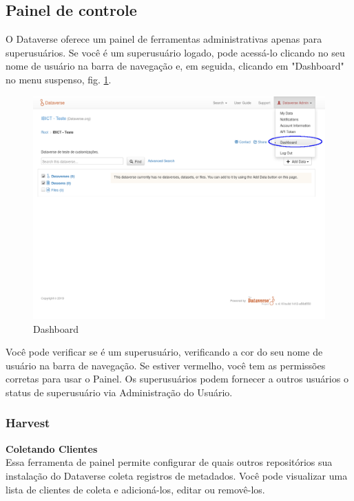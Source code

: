 \documentclass[12pt,hidelinks]{article}
\begin{document}
\newpage

    \subsection{Painel de controle}
    
\qquad O Dataverse oferece um painel de ferramentas administrativas apenas para  superusuários. Se você é um superusuário logado, pode acessá-lo clicando no seu nome de usuário na barra de navegação e, em seguida, clicando em "Dashboard" no menu suspenso, fig. \ref{img01.png}.


\begin{figure}[!htp]
    \centering
      \includegraphics[scale=0.2]{imagens/01.png}
        \caption{Dashboard}
    \label{img01.png}
 \end{figure}

Você pode verificar se é um superusuário, verificando a cor do seu nome de usuário na barra de navegação. Se estiver vermelho, você tem as permissões corretas para usar o Painel. Os superusuários podem fornecer a outros usuários o status de superusuário via Administração do Usuário.

\subsubsection{Harvest}

\qquad\textbf{Coletando Clientes}\\

Essa ferramenta de painel permite configurar de quais outros repositórios sua instalação do Dataverse coleta registros de metadados. Você pode visualizar uma lista de clientes de coleta e adicioná-los, editar ou removê-los.\\
\end{document}
